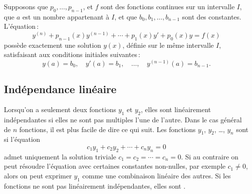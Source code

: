 \begin{theorem}
Supposons que $p_0,\ldots, p_{n-1}$, et $f$ sont des fonctions continues sur un intervalle $I$,
que $a$ est un nombre appartenant à $I$,
et que $b_0, b_1, \ldots, b_{n-1}$ sont des constantes.
L'équation\,: 
\begin{equation*} %
y^{(n)} + p_{n-1}(x)y^{(n-1)} + \cdots + p_1(x) y' + p_0(x) y = f(x) 
\end{equation*}
possède exactement une solution $y(x)$, définie sur le même intervalle $I$, 
satisfaisant aux conditions initiales suivantes\,: 
\begin{equation*}
y(a) = b_0, \quad y'(a) = b_1, \quad \ldots, \quad y^{(n-1)}(a) = b_{n-1} .
\end{equation*}
\end{theorem}

\subsection{Indépendance linéaire}

Lorsqu'on a seulement deux fonctions $y_1$ et $y_2$, elles sont linéairement indépendantes si elles ne sont pas multiples l'une de l'autre. Dans le cas général de $n$ fonctions, il est plus facile de dire ce qui suit. Les fonctions  
$y_1$, $y_2$, \ldots, $y_n$ sont \emph{} si l'équation
\begin{equation*}
c_1 y_1 + c_2 y_2 + \cdots + c_n y_n = 0 
\end{equation*}
admet uniquement la solution triviale $c_1 = c_2 = \cdots = c_n = 0$.  Si au contraire on peut résoudre l'équation avec certaines constantes non-nulles, par exemple  $c_1 \not= 0$, alors on peut exprimer $y_1$ comme une combinaison linéaire des autres. Si les fonctions ne sont pas linéairement indépendantes, elles sont  \emph{}.

